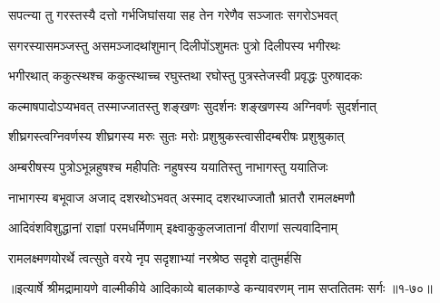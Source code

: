 \twolineshloka
{सपत्न्या तु गरस्तस्यै दत्तो गर्भजिघांसया}
{सह तेन गरेणैव सञ्जातः सगरोऽभवत्} %

\twolineshloka
{सगरस्यासमञ्जस्तु असमञ्जादथांशुमान्}
{दिलीपोंऽशुमतः पुत्रो दिलीपस्य भगीरथः} %

\twolineshloka
{भगीरथात् ककुत्स्थश्च ककुत्स्थाच्च रघुस्तथा}
{रघोस्तु पुत्रस्तेजस्वी प्रवृद्धः पुरुषादकः} %

\twolineshloka
{कल्माषपादोऽप्यभवत् तस्माज्जातस्तु शङ्खणः}
{सुदर्शनः शङ्खणस्य अग्निवर्णः सुदर्शनात्} %

\twolineshloka
{शीघ्रगस्त्वग्निवर्णस्य शीघ्रगस्य मरुः सुतः}
{मरोः प्रशुश्रुकस्त्वासीदम्बरीषः प्रशुश्रुकात्} %

\twolineshloka
{अम्बरीषस्य पुत्रोऽभून्नहुषश्च महीपतिः}
{नहुषस्य ययातिस्तु नाभागस्तु ययातिजः} %

\twolineshloka
{नाभागस्य बभूवाज अजाद् दशरथोऽभवत्}
{अस्माद् दशरथाज्जातौ भ्रातरौ रामलक्ष्मणौ} %

\twolineshloka
{आदिवंशविशुद्धानां राज्ञां परमधर्मिणाम्}
{इक्ष्वाकुकुलजातानां वीराणां सत्यवादिनाम्} %

\twolineshloka
{रामलक्ष्मणयोरर्थे त्वत्सुते वरये नृप}
{सदृशाभ्यां नरश्रेष्ठ सदृशे दातुमर्हसि} %


॥इत्यार्षे श्रीमद्रामायणे वाल्मीकीये आदिकाव्ये बालकाण्डे कन्यावरणम् नाम सप्ततितमः सर्गः ॥१-७०॥
